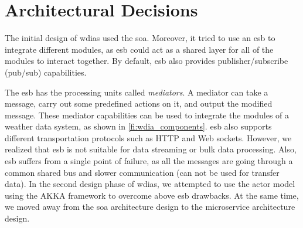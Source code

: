 \section{Architectural Decisions}
\label{se:architectural_decisions}

The initial design of \acrshort{wdias} used the \acrfull{soa}. Moreover, it tried to use an \acrfull{esb} to integrate different modules, as \acrshort{esb} could act as a shared layer for all of the modules to interact together. By default, \acrshort{esb} also provides publisher/subscribe (pub/sub) capabilities.

The \acrshort{esb} has the processing units called \emph{mediators}. A mediator can take a message, carry out some predefined actions on it, and output the modified message. These mediator capabilities can be used to integrate the modules of a weather data system, as shown in \cref{fi:wdia_components}. \acrshort{esb} also supports different transportation protocols such as HTTP and Web sockets. However, we realized that \acrshort{esb} is not suitable for data streaming or bulk data processing. Also, \acrshort{esb} suffers from a single point of failure, as all the messages are going through a common shared bus and slower communication (can not be used for transfer data). In the second design phase of \acrshort{wdias}, we attempted to use the actor model using the AKKA framework \cite{HewittWhyModel} to overcome above \acrshort{esb} drawbacks. At the same time, we moved away from the \acrshort{soa} architecture design to the microservice architecture design.

